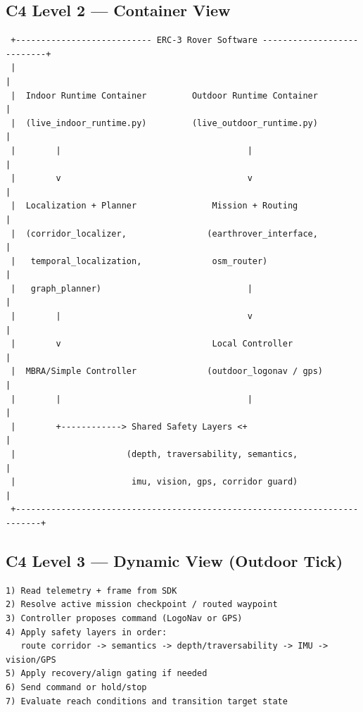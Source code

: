 \documentclass[11pt]{article}
\begin{document}
\subsection{C4 Level 2 — Container View}

\begin{lstlisting}
 +--------------------------- ERC-3 Rover Software ---------------------------+
 |                                                                           |
 |  Indoor Runtime Container         Outdoor Runtime Container               |
 |  (live_indoor_runtime.py)         (live_outdoor_runtime.py)              |
 |        |                                     |                            |
 |        v                                     v                            |
 |  Localization + Planner               Mission + Routing                   |
 |  (corridor_localizer,                (earthrover_interface,               |
 |   temporal_localization,              osm_router)                         |
 |   graph_planner)                             |                            |
 |        |                                     v                            |
 |        v                              Local Controller                    |
 |  MBRA/Simple Controller              (outdoor_logonav / gps)              |
 |        |                                     |                            |
 |        +------------> Shared Safety Layers <+                            |
 |                      (depth, traversability, semantics,                   |
 |                       imu, vision, gps, corridor guard)                   |
 +---------------------------------------------------------------------------+
\end{lstlisting}

\subsection{C4 Level 3 — Dynamic View (Outdoor Tick)}

\begin{lstlisting}
1) Read telemetry + frame from SDK
2) Resolve active mission checkpoint / routed waypoint
3) Controller proposes command (LogoNav or GPS)
4) Apply safety layers in order:
   route corridor -> semantics -> depth/traversability -> IMU -> vision/GPS
5) Apply recovery/align gating if needed
6) Send command or hold/stop
7) Evaluate reach conditions and transition target state
\end{lstlisting}
\end{document}
